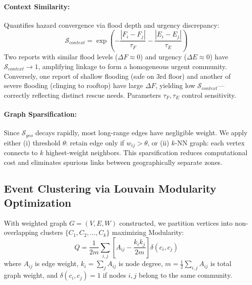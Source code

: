 \documentclass[runningheads]{llncs}
\begin{document}
\paragraph{Context Similarity:}
Quantifies hazard convergence via flood depth and urgency discrepancy:
\begin{equation}
\mathcal{S}_{context} = \exp\left( - \frac{|F_i - F_j|}{\tau_F} - \frac{|E_i - E_j|}{\tau_E} \right)
\end{equation}
Two reports with similar flood levels ($\Delta F \approx 0$) and urgency ($\Delta E \approx 0$) have $\mathcal{S}_{context} \to 1$, amplifying linkage to form a homogeneous urgent community. Conversely, one report of shallow flooding (safe on 3rd floor) and another of severe flooding (clinging to rooftop) have large $\Delta F$, yielding low $\mathcal{S}_{context}$---correctly reflecting distinct rescue needs. Parameters $\tau_F, \tau_E$ control sensitivity.

\paragraph{Graph Sparsification:}
Since $\mathcal{S}_{geo}$ decays rapidly, most long-range edges have negligible weight. We apply either (i) threshold $\theta$: retain edge only if $w_{ij} > \theta$, or (ii) $k$-NN graph: each vertex connects to $k$ highest-weight neighbors. This sparsification reduces computational cost and eliminates spurious links between geographically separate zones.

\subsection{Event Clustering via Louvain Modularity Optimization}

With weighted graph $G=(V,E,W)$ constructed, we partition vertices into non-overlapping clusters $\{C_1, C_2, \ldots, C_k\}$ maximizing Modularity:
\begin{equation}\label{eq:modularity}
Q = \frac{1}{2m} \sum_{i,j} \left[ A_{ij} - \frac{k_i k_j}{2m} \right] \delta(c_i, c_j)
\end{equation}
where $A_{ij}$ is edge weight, $k_i = \sum_j A_{ij}$ is node degree, $m = \frac{1}{2}\sum_{i,j} A_{ij}$ is total graph weight, and $\delta(c_i, c_j)=1$ if nodes $i,j$ belong to the same community.
\end{document}
